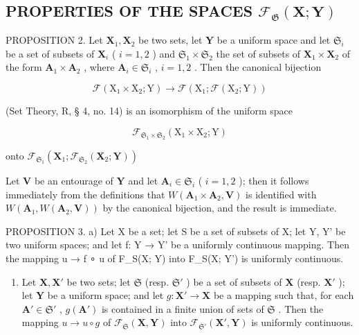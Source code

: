 \subsection{\texorpdfstring{PROPERTIES OF THE SPACES \(\mathcal{F}_{\mathfrak{G}}(\mathbf{X};\mathbf{Y})\)}{PROPERTIES OF THE SPACES F SUB G (X;Y)}}

PROPOSITION 2. Let \(\mathbf{X}_1, \mathbf{X}_2\) be two sets, let \(\mathbf{Y}\) be a uniform space and let \(\mathfrak{S}_i\) be a set of subsets of \(\mathbf{X}_i\) ( \(i = 1, 2\) ) and \(\mathfrak{S}_1 \times \mathfrak{S}_2\) the set of subsets of \(\mathbf{X}_1 \times \mathbf{X}_2\) of the form \(\mathbf{A}_1 \times \mathbf{A}_2\) , where \(\mathbf{A}_i \in \mathfrak{S}_i\) , \(i = 1, 2\) . Then the canonical bijection

\[
\mathscr {F} \left(\mathrm{X} _ {1} \times \mathrm{X} _ {2}; \mathrm{Y}\right)\rightarrow \mathscr {F} \left(\mathrm{X} _ {1}; \mathscr {F} \left(\mathrm{X} _ {2}; \mathrm{Y}\right)\right)
\]

(Set Theory, R, § 4, no. 14) is an isomorphism of the uniform space

\[
\mathcal {F} _ {\mathfrak {S} _ {1} \times \mathfrak {S} _ {2}} (\mathrm{X} _ {1} \times \mathrm{X} _ {2}; \mathrm{Y})
\]

onto \(\mathcal{F}_{\mathfrak{S}_1}(\mathbf{X}_1;\mathcal{F}_{\mathfrak{S}_2}(\mathbf{X}_2;\mathbf{Y}))\)

Let \(\mathbf{V}\) be an entourage of \(\mathbf{Y}\) and let \(\mathbf{A}_i\in \mathfrak{S}_i\) ( \(i = 1,2\) ); then it follows immediately from the definitions that \(W(\mathbf{A}_1\times \mathbf{A}_2,\mathbf{V})\) is identified with \(W(\mathbf{A}_1,W(\mathbf{A}_2,\mathbf{V}))\) by the canonical bijection, and the result is immediate.

PROPOSITION 3. a) Let X be a set; let S be a set of subsets of X; let Y, Y' be two uniform spaces; and let f: Y → Y' be a uniformly continuous mapping. Then the mapping u → f ∘ u of F\_S(X; Y) into F\_S(X; Y') is uniformly continuous.

\begin{enumerate}
\def\labelenumi{\alph{enumi})}
\setcounter{enumi}{1}
\tightlist
\item
  Let \(\mathbf{X}, \mathbf{X}'\) be two sets; let \(\mathfrak{S}\) (resp. \(\mathfrak{S}'\) ) be a set of subsets of \(\mathbf{X}\) (resp. \(\mathbf{X}'\) ); let \(\mathbf{Y}\) be a uniform space; and let \(g: \mathbf{X}' \to \mathbf{X}\) be a mapping such that, for each \(\mathbf{A}' \in \mathfrak{S}'\) , \(g(\mathbf{A}')\) is contained in a finite union of sets of \(\mathfrak{S}\) . Then the mapping \(u \to u \circ g\) of \(\mathcal{F}_{\mathfrak{S}}(\mathbf{X}, \mathbf{Y})\) into \(\mathcal{F}_{\mathfrak{S}'}(\mathbf{X}', \mathbf{Y})\) is uniformly continuous.
\end{enumerate}

